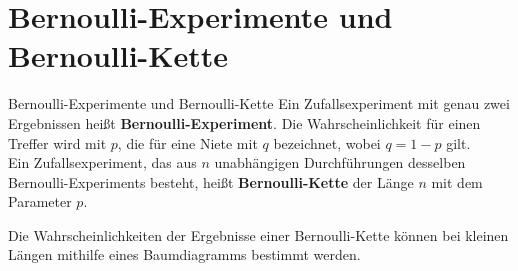 \section{Bernoulli-Experimente und Bernoulli-Kette}
    \begin{defi}{Bernoulli-Experimente und Bernoulli-Kette}{}
    Ein Zufallsexperiment mit genau zwei Ergebnissen heißt \textbf{Bernoulli-Experiment}. Die Wahrscheinlichkeit für einen Treffer wird mit \(p\), die für eine Niete mit \(q\) bezeichnet, wobei \(q=1-p\) gilt.\\
    Ein Zufallsexperiment, das aus \(n\) unabhängigen Durchführungen desselben Bernoulli-Experiments besteht, heißt \textbf{Bernoulli-Kette} der Länge \(n\) mit dem Parameter \(p\).
    \end{defi}
    Die Wahrscheinlichkeiten der Ergebnisse einer Bernoulli-Kette können bei kleinen Längen mithilfe eines Baumdiagramms bestimmt werden.
